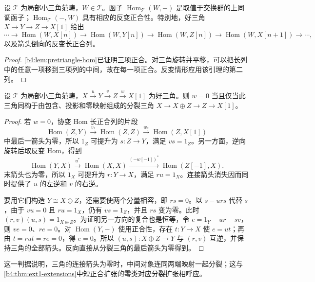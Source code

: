 \begin{proposition}\label{b4:prop:triangle-hom-exact}
	设 \(\mathcal T\) 为局部小三角范畴，\(W\in\mathcal T\)。函子 \(\operatorname{Hom}_{\mathcal T}(W,-)\) 是取值于交换群的上同调函子；\(\operatorname{Hom}_{\mathcal T}(-,W)\) 具有相应的反变正合性。特别地，好三角 \(X\to Y\to Z\to X[1]\) 给出
	\[
		\cdots\to\operatorname{Hom}(W,X[n])\to\operatorname{Hom}(W,Y[n]) \to\operatorname{Hom}(W,Z[n])\to\operatorname{Hom}(W,X[n+1])\to\cdots,
	\]
	以及箭头倒向的反变长正合列。
\end{proposition}
\begin{proof}
	\cref{b4:lem:pretriangle-hom}已证明三项正合。对三角旋转并平移，可以把长列中的任意一项移到三项列的中间，故在每一项正合。反变情形应用该引理的第二列。
\end{proof}

\begin{proposition}\label{b4:prop:split-triangle-criterion}
	设 \(\mathcal T\) 为局部小三角范畴，\(X\xrightarrow{u}Y\xrightarrow{v}Z\xrightarrow{w}X[1]\) 为好三角。则 \(w=0\) 当且仅当此三角同构于由包含、投影和零映射组成的分裂三角 \(X\to X\oplus Z\to Z\to X[1]\)。
\end{proposition}
\begin{proof}
	若 \(w=0\)，协变 Hom 长正合列的片段
	\[
		\operatorname{Hom}(Z,Y)\xrightarrow{v_*}\operatorname{Hom}(Z,Z) \xrightarrow{w_*}\operatorname{Hom}(Z,X[1])
	\]
	中最后一箭头为零，所以 \(1_Z\) 可提升为 \(s:Z\to Y\)，满足 \(vs=1_Z\)。另一方面，逆向旋转后取反变 Hom，得到
	\[
		\operatorname{Hom}(Y,X)\xrightarrow{u^*}\operatorname{Hom}(X,X) \xrightarrow{(-w[-1])^*}\operatorname{Hom}(Z[-1],X).
	\]
	末箭头也为零，所以 \(1_X\) 可提升为 \(r:Y\to X\)，满足 \(ru=1_X\)。连接箭头消失因而同时提供了 \(u\) 的左逆和 \(v\) 的右逆。

	要用它们构造 \(Y\cong X\oplus Z\)，还需要使两个分量相容，即 \(rs=0\)。以 \(s-urs\) 代替 \(s\)，由于 \(vu=0\) 且 \(ru=1_X\)，仍有 \(vs=1_Z\)，并且 \(rs\) 变为零。此时 \((r,v)(u,s)=1_{X\oplus Z}\)。为证明另一方向的复合也是恒等，令 \(e=1_Y-ur-sv\)，则 \(ve=0\)、\(re=0\)。对 \(\operatorname{Hom}(Y,-)\) 使用正合性，存在 \(t:Y\to X\) 使 \(e=ut\)；再由 \(t=rut=re=0\)，得 \(e=0\)。所以 \((u,s):X\oplus Z\to Y\) 与 \((r,v)\) 互逆，并保持三角的全部箭头。反向直接从分裂三角的最后箭头为零得到。
\end{proof}

这一判据说明，三角的连接箭头为零时，中间对象连同两端映射一起分裂；这与\cref{b4:thm:ext1-extensions}中短正合扩张的零类对应分裂扩张相呼应。

